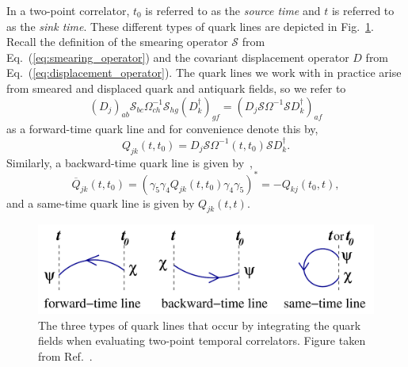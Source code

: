 In a two-point correlator, $t_0$ is referred to as the \emph{source time} and $t$ is referred to as the \emph{sink time}. These different types of quark lines are depicted in Fig.~\ref{fig:quark_lines}. Recall the definition of the smearing operator $\mathcal S$ from Eq.~(\ref{eq:smearing_operator}) and the covariant displacement operator $D$ from Eq.~(\ref{eq:displacement_operator}). The quark lines we work with in practice arise from smeared and displaced quark and antiquark fields, so we refer to
\begin{equation}
    (D_{j})_{a b} \mathcal{S}_{b c} \Omega_{c h}^{-1} \mathcal{S}_{h g}(D_{k}^{\dagger})_{g f}=(D_{j} \mathcal{S} \Omega^{-1} \mathcal{S} D_{k}^{\dagger})_{a f}
\end{equation}
as a forward-time quark line and for convenience denote this by,
\begin{equation}
    Q_{j k}\left(t, t_{0}\right)=D_{j} \mathcal{S} \Omega^{-1}\left(t, t_{0}\right) \mathcal{S} D_{k}^{\dagger}.
\end{equation}
Similarly, a backward-time quark line is given by~\cite{spectroscopy},
\begin{equation}
    \overline{Q}_{j k}\left(t, t_{0}\right)=\left(\gamma_{5} \gamma_{4} Q_{j k}\left(t, t_{0}\right) \gamma_{4} \gamma_{5}\right)^{*} = -Q_{kj}(t_0,t),
\end{equation}
and a same-time quark line is given by $Q_{jk}(t,t)$. 
\begin{figure}
    \centering
    \includegraphics[width=6in]{figures/quarklines.pdf}
    \caption[The three types of quark lines that occur by integrating the quark fields when evaluating two-point temporal correlators.]{The three types of quark lines that occur by integrating the quark fields when evaluating two-point temporal correlators. Figure taken from Ref.~\cite{spectroscopy}.}
    \label{fig:quark_lines}
\end{figure}
